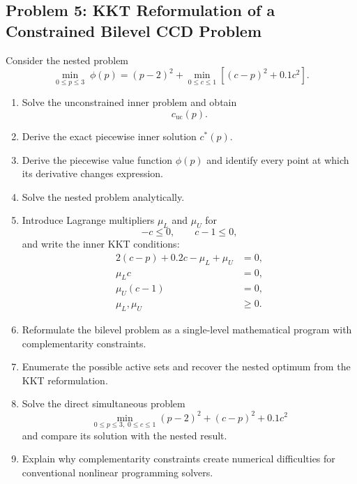 \subsection*{Problem 5: KKT Reformulation of a Constrained Bilevel CCD Problem}

Consider the nested problem
\begin{equation}
\min_{0\leq p\leq3}\;
\phi(p)
=
(p-2)^2
+
\min_{0\leq c\leq1}
\left[
(c-p)^2+0.1c^2
\right].
\end{equation}

\begin{enumerate}
    \item Solve the unconstrained inner problem and obtain
    \begin{equation}
    c_{\mathrm{uc}}(p).
    \end{equation}

    \item Derive the exact piecewise inner solution $c^*(p)$.

    \item Derive the piecewise value function $\phi(p)$ and identify every
    point at which its derivative changes expression.

    \item Solve the nested problem analytically.

    \item Introduce Lagrange multipliers $\mu_L$ and $\mu_U$ for
    \begin{equation}
    -c\leq0,
    \qquad
    c-1\leq0,
    \end{equation}
    and write the inner KKT conditions:
    \begin{align}
    2(c-p)+0.2c-\mu_L+\mu_U&=0,\\
    \mu_Lc&=0,\\
    \mu_U(c-1)&=0,\\
    \mu_L,\mu_U&\geq0.
    \end{align}

    \item Reformulate the bilevel problem as a single-level mathematical
    program with complementarity constraints.

    \item Enumerate the possible active sets and recover the nested optimum
    from the KKT reformulation.

    \item Solve the direct simultaneous problem
    \begin{equation}
    \min_{0\leq p\leq3,\;0\leq c\leq1}
    (p-2)^2+(c-p)^2+0.1c^2
    \end{equation}
    and compare its solution with the nested result.

    \item Explain why complementarity constraints create numerical
    difficulties for conventional nonlinear programming solvers.
\end{enumerate}


